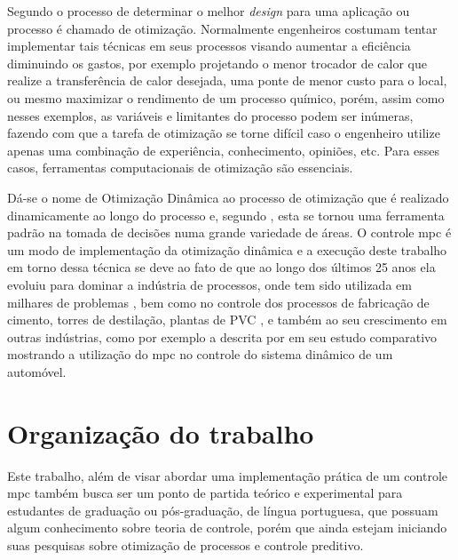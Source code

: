 Segundo  o processo de determinar o melhor \textit{design}
para uma aplicação ou processo é chamado de otimização. Normalmente engenheiros
costumam tentar implementar tais técnicas em seus processos visando aumentar a
eficiência diminuindo os gastos, por exemplo projetando o menor trocador de calor
que realize a transferência de calor desejada, uma ponte de menor custo para o local,
ou mesmo maximizar o rendimento de um processo químico, porém, assim como nesses
exemplos, as variáveis e limitantes do processo podem ser inúmeras, fazendo com que a
tarefa de otimização se torne difícil caso o engenheiro utilize apenas uma combinação
de experiência, conhecimento, opiniões, etc. Para esses casos, ferramentas
computacionais de otimização são essenciais.

Dá-se o nome de Otimização Dinâmica ao processo de otimização que é realizado
dinamicamente ao longo do processo e, segundo , esta se
tornou uma ferramenta padrão na tomada de decisões numa grande variedade de áreas.
O controle \acrshort{mpc} é um modo de implementação da otimização dinâmica e a execução
deste trabalho em torno dessa técnica se deve ao fato de que ao longo dos últimos 25 anos
ela evoluiu para dominar a indústria de processos, onde tem sido utilizada em milhares
de problemas \cite{Borrelli2017}, bem como no controle dos processos de fabricação de cimento,
torres de destilação, plantas de PVC \cite{Camacho2007}, e também ao seu crescimento em outras
indústrias, como por exemplo a descrita por  em seu estudo comparativo
mostrando a utilização do \acrshort{mpc} no controle do sistema dinâmico de um automóvel.

\section{Organização do trabalho}
\label{sec:organizacao_do_trabalho}

Este trabalho, além de visar abordar uma implementação prática de um controle \acrshort{mpc}
também busca ser um ponto de partida teórico e experimental para estudantes de graduação ou
pós-graduação, de língua portuguesa, que possuam algum conhecimento sobre teoria de controle,
porém que ainda estejam iniciando suas pesquisas sobre otimização de processos e controle preditivo.

